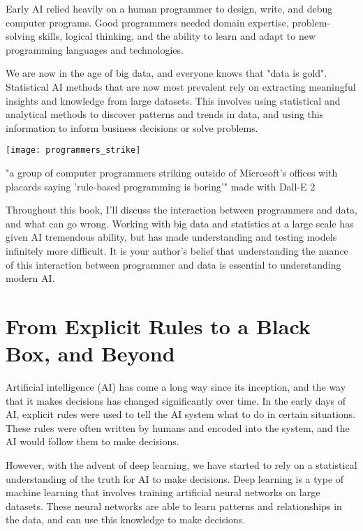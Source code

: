 Early AI relied heavily on a human programmer to design, write, and debug computer programs. Good programmers needed domain expertise, problem-solving skills, logical thinking, and the ability to learn and adapt to new programming languages and technologies.

We are now in the age of big data, and everyone knows that "data is gold". Statistical AI methods that are now most prevalent rely on extracting meaningful insights and knowledge from large datasets. This involves using statistical and analytical methods to discover patterns and trends in data, and using this information to inform business decisions or solve problems.

\begin{pdf}
\begin{marginfigure}[-5.5cm]
        \texttt{[image: programmers\_strike]}
        \caption{"a group of computer programmers striking outside of Microsoft's offices with placards saying 'rule-based programming is boring'" made with Dall-E 2}
\end{marginfigure}
\end{pdf}

Throughout this book, I’ll discuss the interaction between programmers and data, and what can go wrong. Working with big data and statistics at a large scale has given AI tremendous ability, but has made understanding and testing models infinitely more difficult. It is your author’s belief that understanding the nuance of this interaction between programmer and data is essential to understanding modern AI.

\section{From Explicit Rules to a Black Box, and Beyond}

Artificial intelligence (AI) has come a long way since its inception, and the way that it makes decisions has changed significantly over time. In the early days of AI, explicit rules were used to tell the AI system what to do in certain situations. These rules were often written by humans and encoded into the system, and the AI would follow them to make decisions.

However, with the advent of deep learning, we have started to rely on a statistical understanding of the truth for AI to make decisions. Deep learning is a type of machine learning that involves training artificial neural networks on large datasets. These neural networks are able to learn patterns and relationships in the data, and can use this knowledge to make decisions.

